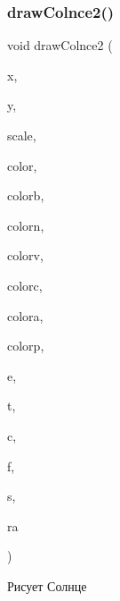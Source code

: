 \subsubsection{\texorpdfstring{draw\+Colnce2()}{drawColnce2()}}
{\footnotesize\ttfamily void draw\+Colnce2 (\begin{DoxyParamCaption}\item[{double}]{x,  }\item[{double}]{y,  }\item[{double}]{scale,  }\item[{C\+O\+L\+O\+R\+R\+EF}]{color,  }\item[{C\+O\+L\+O\+R\+R\+EF}]{colorb,  }\item[{C\+O\+L\+O\+R\+R\+EF}]{colorn,  }\item[{C\+O\+L\+O\+R\+R\+EF}]{colorv,  }\item[{C\+O\+L\+O\+R\+R\+EF}]{colorc,  }\item[{C\+O\+L\+O\+R\+R\+EF}]{colora,  }\item[{C\+O\+L\+O\+R\+R\+EF}]{colorp,  }\item[{double}]{e,  }\item[{double}]{t,  }\item[{int}]{c,  }\item[{double}]{f,  }\item[{int}]{s,  }\item[{int}]{ra }\end{DoxyParamCaption})}



Рисует Солнце 


